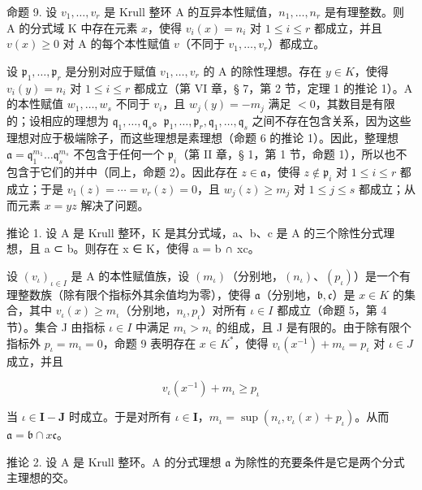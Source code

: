 命题 9. 设 \(v_1, \ldots, v_r\) 是 Krull 整环 A 的互异本性赋值，\(n_1, \ldots, n_r\) 是有理整数。则 A 的分式域 K 中存在元素 \(x\)，使得 \(v_i(x) = n_i\) 对 \(1 \leqslant i \leqslant r\) 都成立，并且 \(v(x) \geqslant 0\) 对 A 的每个本性赋值 \(v\)（不同于 \(v_1, \ldots, v_r\)）都成立。

设 \(\mathfrak{p}_1, \ldots, \mathfrak{p}_r\) 是分别对应于赋值 \(v_1, \ldots, v_r\) 的 A 的除性理想。存在 \(y \in K\)，使得 \(v_i(y) = n_i\) 对 \(1 \leqslant i \leqslant r\) 都成立（第 VI 章，§ 7，第 2 节，定理 1 的推论 1）。A 的本性赋值 \(w_1, \ldots, w_s\) 不同于 \(v_i\)，且 \(w_j(y) = -m_j\) 满足 \(<0\)，其数目是有限的；设相应的理想为 \(\mathfrak{q}_1, \ldots, \mathfrak{q}_s\)。\(\mathfrak{p}_1, \ldots, \mathfrak{p}_r, \mathfrak{q}_1, \ldots, \mathfrak{q}_s\) 之间不存在包含关系，因为这些理想对应于极端除子，而这些理想是素理想（命题 6 的推论 1）。因此，整理想 \(\mathfrak{a} = \mathfrak{q}_1^{m_1} \ldots \mathfrak{q}_s^{m_s}\) 不包含于任何一个 \(\mathfrak{p}_i\)（第 II 章，§ 1，第 1 节，命题 1），所以也不包含于它们的并中（同上，命题 2）。因此存在 \(z \in \mathfrak{a}\)，使得 \(z \notin \mathfrak{p}_i\) 对 \(1 \leqslant i \leqslant r\) 都成立；于是 \(v_1(z) = \cdots = v_r(z) = 0\)，且 \(w_j(z) \geqslant m_j\) 对 \(1 \leqslant j \leqslant s\) 都成立；从而元素 \(x = yz\) 解决了问题。

推论 1. 设 A 是 Krull 整环，K 是其分式域，a、b、c 是 A 的三个除性分式理想，且 a ⊂ b。则存在 x ∈ K，使得 a = b ∩ xc。

设 \((v_{\iota})_{\iota \in I}\) 是 A 的本性赋值族，设 \((m_{\iota})\)（分别地，\((n_{\iota})\)、\((p_{\iota})\)）是一个有理整数族（除有限个指标外其余值均为零），使得 \(\mathfrak{a}\)（分别地，\(\mathfrak{b}, \mathfrak{c}\)）是 \(x \in K\) 的集合，其中 \(v_{\iota}(x) \geqslant m_{\iota}\)（分别地，\(n_{\iota}, p_{\iota}\)）对所有 \(\iota \in I\) 都成立（命题 5，第 4 节）。集合 J 由指标 \(\iota \in I\) 中满足 \(m_{\iota} > n_{\iota}\) 的组成，且 J 是有限的。由于除有限个指标外 \(p_{\iota} = m_{\iota} = 0\)，命题 9 表明存在 \(x \in K^{*}\)，使得 \(v_{\iota}(x^{-1}) + m_{\iota} = p_{\iota}\) 对 \(\iota \in J\) 成立，并且

\[
v _ {\iota} (x ^ {- 1}) + m _ {\iota} \geqslant p _ {\iota}
\]

当 \(\iota \in \mathbf{I} - \mathbf{J}\) 时成立。于是对所有 \(\iota \in \mathbf{I}\)，\(m_{\iota} = \sup (n_{\iota}, v_{\iota}(x) + p_{\iota})\)。从而 \(\mathfrak{a} = \mathfrak{b} \cap x\mathfrak{c}\)。

推论 2. 设 A 是 Krull 整环。A 的分式理想 \(\mathfrak{a}\) 为除性的充要条件是它是两个分式主理想的交。

